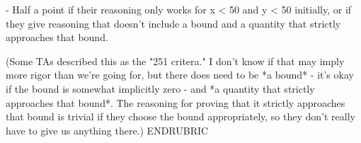   - Half a point if their reasoning only works for x < 50 and y < 50
    initially, or if they give reasoning that doesn't include a bound
    and a quantity that strictly approaches that bound.

(Some TAs described this as the "251 critera." I don't know if that
may imply more rigor than we're going for, but there does need to be
*a bound* - it's okay if the bound is somewhat implicitly zero - and
*a quantity that strictly approaches that bound*. The reasoning for
proving that it strictly approaches that bound is trivial if they
choose the bound appropriately, so they don't really have to give us
anything there.)
ENDRUBRIC
